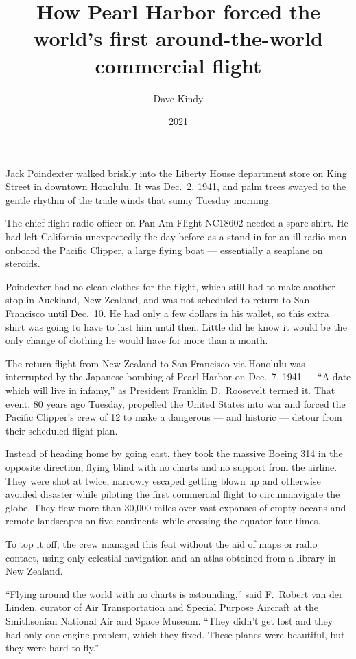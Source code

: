 \documentclass[12pt]{article}
\title{How Pearl Harbor forced the world’s first around-the-world commercial flight}
\author{Dave Kindy}
\date{2021}
\begin{document}
\maketitle

Jack Poindexter walked briskly into the Liberty House department store on King Street in downtown Honolulu. It was Dec.~2, 1941, and palm trees swayed to the gentle rhythm of the trade winds that sunny Tuesday morning.

The chief flight radio officer on Pan Am Flight NC18602 needed a spare shirt. He had left California unexpectedly the day before as a stand-in for an ill radio man onboard the Pacific Clipper, a large flying boat --- essentially a seaplane on steroids.

Poindexter had no clean clothes for the flight, which still had to make another stop in Auckland, New Zealand, and was not scheduled to return to San Francisco until Dec.~10. He had only a few dollars in his wallet, so this extra shirt was going to have to last him until then. Little did he know it would be the only change of clothing he would have for more than a month.

The return flight from New Zealand to San Francisco via Honolulu was interrupted by the Japanese bombing of Pearl Harbor on Dec.~7, 1941 --- ``A date which will live in infamy,'' as President Franklin D.~Roosevelt termed it. That event, 80 years ago Tuesday, propelled the United States into war and forced the Pacific Clipper’s crew of 12 to make a dangerous --- and historic --- detour from their scheduled flight plan.

Instead of heading home by going east, they took the massive Boeing 314 in the opposite direction, flying blind with no charts and no support from the airline. They were shot at twice, narrowly escaped getting blown up and otherwise avoided disaster while piloting the first commercial flight to circumnavigate the globe. They flew more than 30,000 miles over vast expanses of empty oceans and remote landscapes on five continents while crossing the equator four times.

To top it off, the crew managed this feat without the aid of maps or radio contact, using only celestial navigation and an atlas obtained from a library in New Zealand.

``Flying around the world with no charts is astounding,'' said F.~Robert van der Linden, curator of Air Transportation and Special Purpose Aircraft at the Smithsonian National Air and Space Museum. ``They didn’t get lost and they had only one engine problem, which they fixed. These planes were beautiful, but they were hard to fly.''
\end{document}

